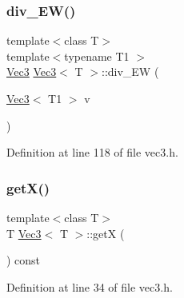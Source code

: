 \subsubsection{\texorpdfstring{div\_EW()}{div\_EW()}\hspace{0.1cm}{\footnotesize\ttfamily [2/2]}}
{\footnotesize\ttfamily template$<$class T$>$ \\
template$<$typename T1 $>$ \\
\mbox{\hyperlink{class_vec3}{Vec3}} \mbox{\hyperlink{class_vec3}{Vec3}}$<$ T $>$\+::div\+\_\+\+EW (\begin{DoxyParamCaption}\item[{\mbox{\hyperlink{class_vec3}{Vec3}}$<$ T1 $>$}]{v }\end{DoxyParamCaption})\hspace{0.3cm}{\ttfamily [inline]}}



Definition at line 118 of file vec3.\+h.

\mbox{\label{class_vec3_ad259e243f6678730d990acbae2cdff57}} 
\subsubsection{\texorpdfstring{getX()}{getX()}}
{\footnotesize\ttfamily template$<$class T$>$ \\
T \mbox{\hyperlink{class_vec3}{Vec3}}$<$ T $>$\+::getX (\begin{DoxyParamCaption}{ }\end{DoxyParamCaption}) const\hspace{0.3cm}{\ttfamily [inline]}}



Definition at line 34 of file vec3.\+h.

